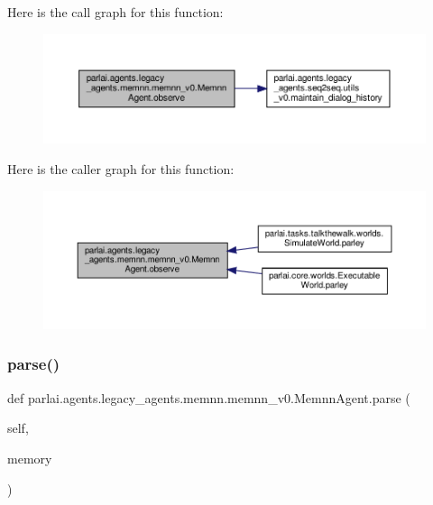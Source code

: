 Here is the call graph for this function\+:
\nopagebreak
\begin{figure}[H]
\begin{center}
\leavevmode
\includegraphics[width=350pt]{classparlai_1_1agents_1_1legacy__agents_1_1memnn_1_1memnn__v0_1_1MemnnAgent_a0f8358dd299ba6719f7354771938fd7b_cgraph}
\end{center}
\end{figure}
Here is the caller graph for this function\+:
\nopagebreak
\begin{figure}[H]
\begin{center}
\leavevmode
\includegraphics[width=350pt]{classparlai_1_1agents_1_1legacy__agents_1_1memnn_1_1memnn__v0_1_1MemnnAgent_a0f8358dd299ba6719f7354771938fd7b_icgraph}
\end{center}
\end{figure}
\mbox{\label{classparlai_1_1agents_1_1legacy__agents_1_1memnn_1_1memnn__v0_1_1MemnnAgent_a5e9b6393cb251b6030bb9a0db51b8026}} 
\subsubsection{\texorpdfstring{parse()}{parse()}}
{\footnotesize\ttfamily def parlai.\+agents.\+legacy\+\_\+agents.\+memnn.\+memnn\+\_\+v0.\+Memnn\+Agent.\+parse (\begin{DoxyParamCaption}\item[{}]{self,  }\item[{}]{memory }\end{DoxyParamCaption})}

